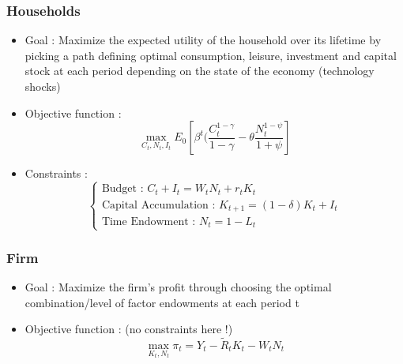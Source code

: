 \documentclass{article}
\begin{document}
\subsubsection{Households}
\begin{itemize}
    \item Goal : Maximize the expected utility of the household over its lifetime by picking a path defining optimal consumption, leisure, investment and capital stock at each period depending on the state of the economy (technology shocks)
    \item Objective function : 
    \begin{equation}
        \max_{C_t,N_t,I_t}E_0[\beta^t(\frac{C_t^{1-\gamma}}{1-\gamma} - \theta\frac{N_t^{1-\psi}}{1+\psi}]
    \end{equation}
    \item Constraints :
    \begin{equation}
    \left\{
    \begin{aligned} 
    \text{Budget : } C_t + I_t = W_tN_t + r_tK_t\\
    \text{Capital Accumulation : } K_{t+1} = (1-\delta)K_t + I_t\\
    \text{Time Endowment : } N_t = 1-L_t
    \end{aligned}
    \right.
    \end{equation} 
\end{itemize}

\subsubsection{Firm}
\begin{itemize}
    \item Goal : Maximize the firm's profit through choosing the optimal combination/level of factor endowments at each period t
    \item Objective function : (no constraints here !)
    \begin{equation}
        \max_{K_t, N_t}\pi_t = Y_t - \tilde{R}_tK_t - W_tN_t
    \end{equation}
\end{itemize}
\end{document}
